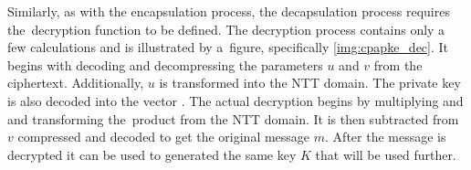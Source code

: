 Similarly, as with the encapsulation process, the decapsulation process requires the~decryption function to be defined. The decryption process contains only a few calculations and is illustrated by a~figure, specifically \ref{img:cpapke_dec}. It begins with decoding and decompressing the parameters $u$ and $v$ from the ciphertext. Additionally, $u$ is transformed into the NTT domain. The private key is also decoded into the vector . The actual decryption begins by multiplying  and  and transforming the~product from the NTT domain. It is then subtracted from $v$ compressed and decoded to get the original message $m$. After the message is decrypted it can be used to generated the same key $K$ that will be used further.

